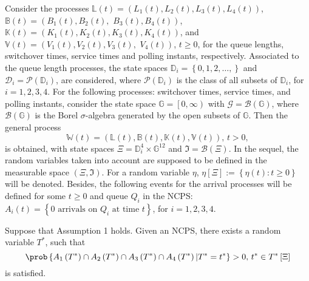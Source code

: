 Consider the processes  $\mathbb{L}\left(t\right)=\left(L_{1}\left(t\right),L_{2}\left(t\right),L_{3}\left(t\right),L_{4}\left(t\right)\right)$, $\mathbb{B}\left(t\right)=\left(B_{1}\left(t\right),B_{2}\left(t\right),\right.$ $\left.B_{3}\left(t\right),B_{4}\left(t\right)\right)$, $\mathbb{K}\left(t\right)=\left(K_{1}\left(t\right),K_{2}\left(t\right),K_{3}\left(t\right),K_{4}\left(t\right)\right)$, and $\mathbb{V}\left(t\right)=\left(V_{1}\left(t\right),V_{2}\left(t\right),V_{3}\left(t\right),\right.$ $\left.V_{4}\left(t\right)\right)$, $t\geq0$, for the queue lengths, switchover times, service times and polling instants, respectively. Associated to  the queue length processes, the state spaces $\mathbb{D}_{i}=\left\{0,1,2,\ldots,\right\}$ and $\mathcal{D}_{i}=\mathcal{P}\left(\mathbb{D}_{i}\right)$, are considered, where $\mathcal{P}\left(\mathbb{D}_{i}\right)$ is the class of all subsets of $\mathbb{D}_{i}$, for $i=1,2,3,4$. For the following processes: switchover times, service times, and polling instants, consider the state space $\mathbb{G}=\left[0,\infty\right)$ with $\mathcal{G}=\mathcal{B}\left(\mathbb{G}\right)$, where $\mathcal{B}\left(\mathbb{G}\right)$ is the Borel $\sigma$-algebra generated by the open subsets of $\mathbb{G}$. Then the general process $$\mathbb{W}\left(t\right)=\left(\mathbb{L}\left(t\right),\mathbb{B}\left(t\right),\mathbb{K}\left(t\right),\mathbb{V}\left(t\right)\right)\textrm{,  }t>0,$$ is obtained, with state spaces $\Xi=\mathbb{D}_{i}^{4}\times \mathbb{G}^{12}$ and $\Im=\mathcal{B}\left(\Xi\right)$. In the sequel, the random variables taken into account are supposed to be defined in the measurable space $\left(\Xi,\Im\right)$. For a random variable $\eta$, $\eta\left[\Xi\right]:=\left\{\eta\left(t\right):t\geq0\right\}$ will be denoted. Besides, the following events for the arrival processes will be defined for some $t\geq0$ and queue $Q_{i}$ in the NCPS:  $A_{i}\left(t\right)=\left\{0 \textrm{ arrivals on }Q_{i}\textrm{ at time }t\right\}$,  for $i=1,2,3,4$.\medskip
\begin{Teo}\label{First.Regeneration.Time.Theorem}
Suppose that Assumption 1 holds. Given an NCPS, there exists a random variable $T^{*}$, such that $$\prob\left\{A_{1}\left(T^{*}\right)\cap A_{2}\left(T^{*}\right)\cap
A_{3}\left(T^{*}\right)\cap A_{4}\left(T^{*}\right)|T^{*}=t^{*}\right\}>0\textrm{, }t^{*}\in T^{*}\left[\Xi\right]$$  is satisfied.
\end{Teo}
